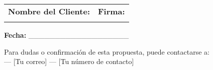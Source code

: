 \documentclass[12pt,a4paper]{article}
\begin{document}
\begin{tabular}{p{7cm} p{7cm}}
\textbf{Nombre del Cliente:} & \textbf{Firma:} \\
\\[1.5cm]
\hline
\end{tabular}

\vspace{1cm}
\noindent
\textbf{Fecha:} \_\_\_\_\_\_\_\_\_\_\_\_\_\_\_\_\_\_\_

\vfill
\begin{center}
\small Para dudas o confirmación de esta propuesta, puede contactarse a:\\
[Tu nombre o empresa] — [Tu correo] — [Tu número de contacto]
\end{center}
\end{document}

